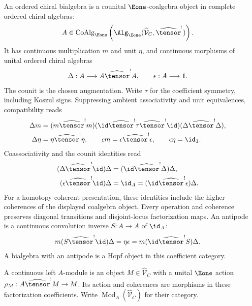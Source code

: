 \begin{definition}\label{def:vol4-ordered-chiral-bialgebra}
An ordered chiral bialgebra is a counital $\Eone$-coalgebra object
in complete ordered chiral algebras:
\[
 A\in\operatorname{CoAlg}_{\Eone}
 \left(\Alg_{\Eone}
 (\widehat{\mathcal V}_C,\widehat{\tensor}^{!})\right).
\]
It has continuous multiplication $m$ and unit $\eta$, and continuous
morphisms of unital ordered chiral algebras
\[
 \Delta:A\longrightarrow A\widehat{\tensor}^{!}A,
 \qquad \epsilon:A\longrightarrow\mathbf1.
\]
The counit is the chosen augmentation.
Write $\tau$ for the coefficient symmetry, including Koszul signs.
Suppressing ambient associativity and unit equivalences, compatibility reads
\[
\begin{aligned}
 \Delta m&=(m\widehat{\tensor}^{!}m)
  (\id\widehat{\tensor}^{!}\tau\widehat{\tensor}^{!}\id)
  (\Delta\widehat{\tensor}^{!}\Delta),\\
 \Delta\eta&=\eta\widehat{\tensor}^{!}\eta,
 \qquad \epsilon m=\epsilon\widehat{\tensor}^{!}\epsilon,
 \qquad \epsilon\eta=\id_{\mathbf1}.
\end{aligned}
\]
Coassociativity and the counit identities read
\[
\begin{aligned}
 (\Delta\widehat{\tensor}^{!}\id)\Delta
   &=(\id\widehat{\tensor}^{!}\Delta)\Delta,\\
 (\epsilon\widehat{\tensor}^{!}\id)\Delta
   &=\id_A=(\id\widehat{\tensor}^{!}\epsilon)\Delta.
\end{aligned}
\]
For a homotopy-coherent presentation, these identities include the
higher coherences of the displayed coalgebra object.
Every operation and coherence preserves diagonal transitions and
disjoint-locus factorization maps.
An antipode is a continuous convolution inverse $S:A\to A$ of $\id_A$:
\[
 m(S\widehat{\tensor}^{!}\id)\Delta
 =\eta\epsilon
 =m(\id\widehat{\tensor}^{!}S)\Delta.
\]
A bialgebra with an antipode is a Hopf object in this coefficient category.
\end{definition}

A continuous left $A$-module is an object $M\in\widehat{\mathcal V}_C$
with a unital $\Eone$ action
$\rho_M:A\widehat{\tensor}^{!}M\to M$.
Its action and coherences are morphisms in these factorization coefficients.
Write $\operatorname{Mod}_A(\widehat{\mathcal V}_C)$ for their category.

